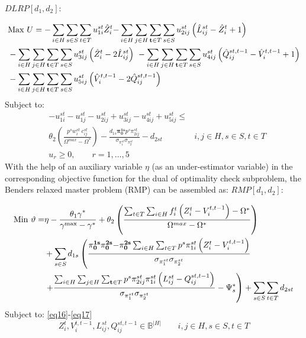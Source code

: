 \documentclass[review]{elsarticle}
\begin{document}
$DLRP[d_{1} ,d_{2}]$:

\begin{align}
&{\rm Max}\ U=-\sum_{i\in H}{\sum_{s\in S}{\sum_{t\in T}{u^{st}_{1i}{\hat{Z}}^t_i}}}\mathbf{ -}\sum_{i\in H}{\sum_{j\in H}{\sum_{\mathbf{ t}\in T}{\sum_{s\in S}{u^{st}_{2ij}\left({\hat{L}}^{st}_{ij}-{\hat{Z}}^t_i+1\right)\ }}}}\label{eq38}\\
&-\sum_{i\in H}{\sum_{j\in H}{\sum_{\mathbf{t}\in T}{\sum_{s\in S}{u^{st}_{3ij}\left({\hat{Z}}^t_i-2{\hat{L}}^{st}_{ij}\right)\ }}}}-\sum_{i\in H}{\sum_{j\in H}{\sum_{\mathbf{ t}\in T}{\sum_{s\in S}{u^{st}_{4ij}\left({\hat{Q}}^{st,t-1}_{ij}-{\hat{V}}^{t,t-1}_i+1\right)}}}}\nonumber\\
&-\sum_{i\in H}{\sum_{j\in H}{\sum_{\mathbf{ t}\in T}{\sum_{s\in S}{u^{st}_{5ij}\left({\hat{V}}^{t,t-1}_i-2{\hat{Q}}^{st,t-1}_{ij}\right)\ }}}}\nonumber
\end{align}
Subject to:
\begin{align}
&-u^{st}_{1i}-u^{st}_{1j}-u^{st}_{2ij}+u^{st}_{3ij}-u^{st}_{4ij}+u^{st}_{5ij}\leq &\nonumber\\
&{\theta }_2\left(\frac{p^sw^{st}_i{\ c}^{st}_{ij}}{{\Omega }^{max}-{\Omega }^*}\right)-\frac{d_{1s}{\mathbf{ \pi }}^{\mathbf{ 1}\mathbf{ s}}_{\mathbf{ 0}}p^s\pi^{st}_{2ij}}{{\sigma }_{{\pi }^{st}_{1}}{\sigma }_{{\pi }^{st}_{2}}}-d_{2st}&i,j\in H, s\in S, t\in T\label{eq39}\\
&u_r\geq 0,\qquad r=1,\ldots, 5 &\label{eq40}
\end{align}
With the help of an auxiliary variable $\eta$ (as an under-estimator variable) in the corresponding objective function for the dual of optimality check subproblem, the Benders relaxed master problem (RMP) can be assembled as: $RMP [d_1,d_2]$:

\begin{align}\label{eq41}
{\rm Min}~\vartheta=&\eta-\frac{{{\theta }_1\gamma }^*}{{\gamma }^{\max}-{\gamma }^*}+{\theta }_2\left(\frac{\sum_{t\in T}{\sum_{i\in H}{f^t_i\left(Z^t_i-V^{t,t-1}_i\right)}}-{\Omega }^*}{{\Omega }^{max}-{\Omega }^*}\right)\\
&+\sum_{s\in S}{d_{1s}}\left(\frac{{\mathbf{ \pi }}^{\mathbf{ 1}\mathbf{ s}}_{\mathbf{ 0}}{\mathbf{ \pi }}^{\mathbf{ 2}\mathbf{ s}}_{\mathbf{ 0}}\mathbf{ -}{\mathbf{ \pi }}^{\mathbf{ 2}\mathbf{ s}}_{\mathbf{ 0}}\sum_{i\in H}{\sum_{t\in T}{p^s{\pi }^{st}_{1i}\left(Z^t_i-V^{t,t-1}_i\right)}}}{{\sigma }_{{\pi }^{st}_{1}}{\sigma }_{{\pi }^{st}_{2}}}\nonumber\right.\\
&\left.+\frac{\sum_{i\in H}{\sum_{j\in H}{\sum_{\mathbf{ t}\in T}{p^s{\pi }^{st}_{2ij}{\pi }^{st}_{1i}\left(L^{st}_{ij}-Q^{st,t-1}_{ij}\right)}}}}{{\sigma }_{{\pi }^{st}_{1}}{\sigma }_{{\pi }^{st}_{2}}}-{\Psi }^*_s\right)+\sum_{s\in S}{\sum_{t\in T}{d_{2st}}}\nonumber
\end{align}
Subject to: \eqref{eq16}-\eqref{eq17}
\[
Z^t_i, V^{t,t-1}_i, L^{st}_{ij}, Q^{st,t-1}_{ij}\in {\mathbb{ B}}^{\left|H\right|}\qquad i,j\in H, s\in S, t\in T\]
\end{document}
